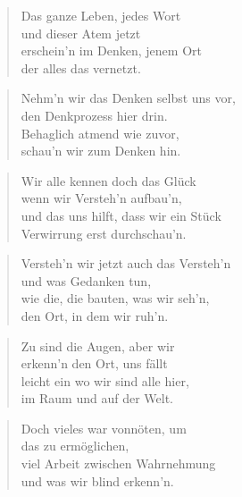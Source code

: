\documentclass[10pt,a4paper]{article}
\begin{document}
\begin{multicols}{2}


\begin{verse}
Das ganze Leben, jedes Wort \\
und dieser Atem jetzt \\
erschein’n im Denken, jenem Ort \\
der alles das vernetzt. \\
\end{verse}

\begin{verse}
Nehm’n wir das Denken selbst uns vor, \\
den Denkprozess hier drin. \\
Behaglich atmend wie zuvor, \\
schau’n wir zum Denken hin. \\
\end{verse}

\begin{verse}
Wir alle kennen doch das Glück \\
wenn wir Versteh’n aufbau’n, \\
und das uns hilft, dass wir ein Stück \\
Verwirrung erst durchschau’n. \\
\end{verse}

\begin{verse}
Versteh’n wir jetzt auch das Versteh’n \\
und was Gedanken tun, \\
wie die, die bauten, was wir seh’n, \\
den Ort, in dem wir ruh’n. \\
\end{verse}

\begin{verse}
Zu sind die Augen, aber wir \\
erkenn’n den Ort, uns fällt \\
leicht ein wo wir sind alle hier, \\
im Raum und auf der Welt. \\
\end{verse}

\begin{verse}
Doch vieles war vonnöten, um \\
das zu ermöglichen, \\
viel Arbeit zwischen Wahrnehmung \\
und was wir blind erkenn’n. \\
\end{verse}


\end{multicols}
\end{document}

